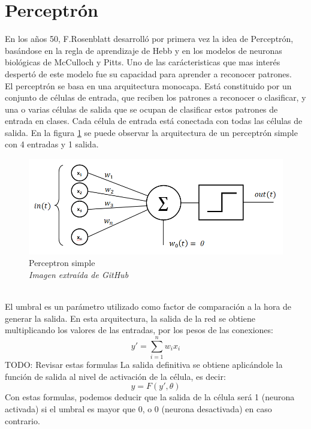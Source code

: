 \section {Perceptrón}
En los años 50, F.Rosenblatt desarrolló por primera vez la idea de Perceptrón, basándose en la regla de aprendizaje de Hebb y en los modelos de neuronas biológicas de McCulloch y Pitts. Uno de las carácteristicas que mas interés despertó de este modelo fue su capacidad para aprender a reconocer patrones.\\
El perceptrón se basa en una arquitectura monocapa. Está constituido por un conjunto de células de entrada, que reciben los patrones a reconocer o clasificar, y una o varias células de salida que se ocupan de clasificar estos patrones de entrada en clases. Cada célula de entrada está conectada con todas las células de salida. En la figura \ref{perceptron} se puede observar la arquitectura de un perceptrón simple con 4 entradas y 1 salida.
\begin{figure}[htp]
\centering
\vspace{-1em}
\includegraphics[scale=0.5]{images/perceptron.png}
\caption{Perceptron simple\\\textit{Imagen extraída de GitHub}}
\label{perceptron}
\end{figure}
\\El umbral es un parámetro utilizado como factor de comparación a la hora de generar la salida. En esta arquitectura, la salida de la red se obtiene multiplicando los valores de las entradas, por los pesos de las conexiones:
\begin{equation}\label{Umbral perceptron}
y' =  \sum_{i=1}^{n} w_{i}x_{i}
\end{equation}
TODO: Revisar estas formulas
La salida definitiva se obtiene aplicándole la función de salida al nivel de activación de la célula, es decir:
\begin{equation}\label{Salida perceptron}
y =  F(y', \theta)
\end{equation}
Con estas formulas, podemos deducir que la salida de la célula será 1 (neurona activada) si el umbral es mayor que 0, o 0 (neurona desactivada) en caso contrario.\\
